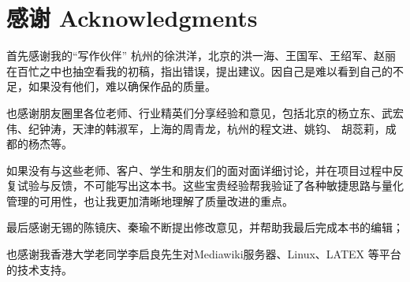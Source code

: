 \chapter*{感谢 Acknowledgments } %

首先感谢我的“写作伙伴” 杭州的徐洪洋，北京的洪一海、王国军、王绍军、赵丽在百忙之中也抽空看我的初稿，指出错误，提出建议。因自己是难以看到自己的不足，如果没有他们，难以确保作品的质量。

也感谢朋友圈里各位老师、行业精英们分享经验和意见，包括北京的杨立东、武宏伟、纪钟涛，天津的韩淑军，上海的周青龙，杭州的程文进、姚钧、 胡蕊莉，成都的杨杰等。

如果没有与这些老师、客户、学生和朋友们的面对面详细讨论，并在项目过程中反复试验与反馈，不可能写出这本书。这些宝贵经验帮我验证了各种敏捷思路与量化管理的可用性，也让我更加清晰地理解了质量改进的重点。

最后感谢无锡的陈镜庆、秦瑜不断提出修改意见，并帮助我最后完成本书的编辑；

也感谢我香港大学老同学李启良先生对Mediawiki服务器、Linux、LATEX 等平台的技术支持。 